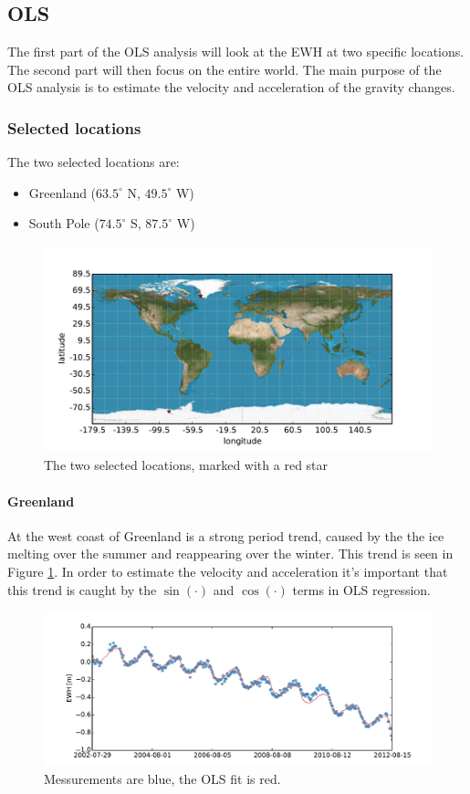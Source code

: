 \subsection{OLS}

The first part of the OLS analysis will look at the EWH at two specific locations. The second part will then focus on the entire world. The main purpose of the OLS analysis is to estimate the velocity and acceleration of the gravity changes.

\subsubsection{Selected locations}

The two selected locations are:
\begin{itemize}
\item Greenland ($63.5^\circ$ N, $49.5^\circ$ W)
\item South Pole ($74.5^\circ$ S, $87.5^\circ$ W)
\end{itemize}
\begin{figure}[H]
	\centering
	\includegraphics[height=6cm]{figures/ols-selected-map}
	\caption{The two selected locations, marked with a red star}
\end{figure}

\paragraph{Greenland}

At the west coast of Greenland is a strong period trend, caused by the the ice melting over the summer and reappearing over the winter. This trend is seen in Figure \ref{fig:ols-selected-0-fit}. In order to estimate the velocity and acceleration it's important that this trend is caught by the $\sin(\cdot)$ and $\cos(\cdot)$ terms in OLS regression.
\begin{figure}[H]
	\centering
	\includegraphics[width=\textwidth]{figures/ols-selected-0-fit}
	\caption{Messurements are blue, the OLS fit is red.}
	\label{fig:ols-selected-0-fit}
\end{figure}
 
